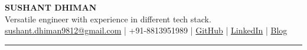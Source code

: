 \documentclass[]{deedy-resume-reversed}
\begin{document}
%
%

%
%
\begin{center}
    \LARGE
    \textbf{SUSHANT DHIMAN} \\
     \vspace{0.1cm}
    \normalsize
    Versatile engineer with experience in different tech stack. \\
     \vspace{0.1cm}
    \href{mailto:sushant.dhiman9812@gmail.com}{sushant.dhiman9812@gmail.com} | 
    +91-8813951989 | 
    \href{https://github.com/sushant102004}{GitHub}{\small{ \faExternalLink*}} |  
    \href{https://www.linkedin.com/in/sushant102004/}{LinkedIn}{ \small{\faExternalLink*}} | 
    \href{https://sushantcodes.tech}{Blog}{ \small{\faExternalLink*}}
\end{center}
\rule{\textwidth}{0.3mm}
%
%
\end{document}
